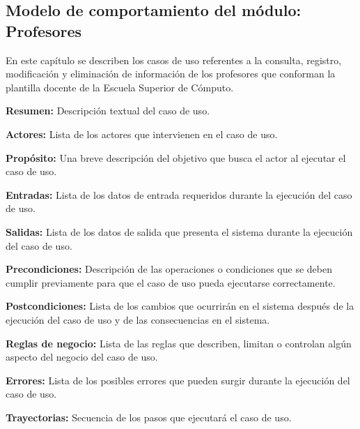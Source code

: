 
\newpage
\subsection{Modelo de comportamiento del módulo:  Profesores \label{chp:modeloComportamientoProfesores}}

En este capítulo se describen los casos de uso referentes a la consulta, registro, modificación y eliminación de información de los profesores que conforman la plantilla docente de la Escuela Superior de Cómputo. \bigskip

\begin{objetivos}
	\item {\bf Resumen:} Descripción textual del caso de uso.
	\item {\bf Actores:} Lista de los actores que intervienen en el caso de uso.
	\item {\bf Propósito:} Una breve descripción del objetivo que busca el actor al ejecutar el caso de uso.
	\item {\bf Entradas:} Lista de los datos de entrada requeridos durante la ejecución del caso de uso.
	\item {\bf Salidas:} Lista de los datos de salida que presenta el sistema durante la ejecución del caso de uso.
	\item {\bf Precondiciones:} Descripción de las operaciones o condiciones que se deben cumplir previamente para que el caso de uso pueda ejecutarse correctamente.
	\item {\bf Postcondiciones:} Lista de los cambios que ocurrirán en el sistema después de la ejecución del caso de uso y de las consecuencias en el sistema.
	\item {\bf Reglas de negocio:} Lista de las reglas que describen, limitan o controlan algún aspecto del negocio del caso de uso.
	\item {\bf Errores:} Lista de los posibles errores que pueden surgir durante la ejecución del caso de uso.
	\item {\bf Trayectorias:} Secuencia de los pasos que ejecutará el caso de uso.
\end{objetivos}
